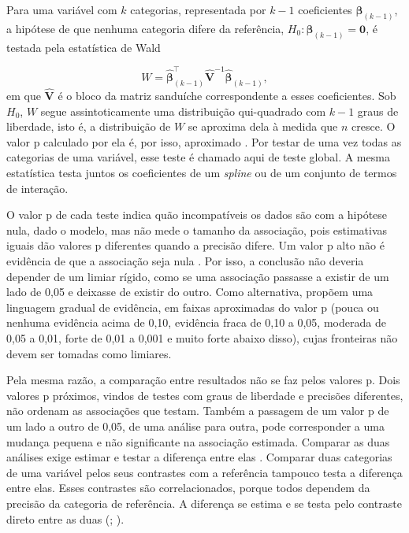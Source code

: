 \documentclass[12pt,a4paper]{article}
\begin{document}
Para uma variável com $k$ categorias, representada por $k-1$ coeficientes $\boldsymbol{\beta}_{(k-1)}$, a hipótese de que nenhuma categoria difere da referência, $H_0: \boldsymbol{\beta}_{(k-1)} = \mathbf{0}$, é testada pela estatística de Wald

\begin{equation}
  W = \hat{\boldsymbol{\beta}}_{(k-1)}^\top \widehat{\mathbf{V}}^{-1} \hat{\boldsymbol{\beta}}_{(k-1)},
\end{equation}
em que $\widehat{\mathbf{V}}$ é o bloco da matriz sanduíche correspondente a esses coeficientes. Sob $H_0$, $W$ segue assintoticamente uma distribuição qui-quadrado com $k-1$ graus de liberdade, isto é, a distribuição de $W$ se aproxima dela à medida que $n$ cresce. O valor p calculado por ela é, por isso, aproximado \citep[pp.~129--131, 280]{agresti2015foundations}. Por testar de uma vez todas as categorias de uma variável, esse teste é chamado aqui de teste global. A mesma estatística testa juntos os coeficientes de um \textit{spline} ou de um conjunto de termos de interação.

O valor p de cada teste indica quão incompatíveis os dados são com a hipótese nula, dado o modelo, mas não mede o tamanho da associação, pois estimativas iguais dão valores p diferentes quando a precisão difere. Um valor p alto não é evidência de que a associação seja nula \citep[p.~341]{wasserstein2016asa,greenland2016statistical}. Por isso, a conclusão não deveria depender de um limiar rígido, como se uma associação passasse a existir de um lado de 0,05 e deixasse de existir do outro. Como alternativa, \citet{muff2022rewriting} propõem uma linguagem gradual de evidência, em faixas aproximadas do valor p (pouca ou nenhuma evidência acima de 0,10, evidência fraca de 0,10 a 0,05, moderada de 0,05 a 0,01, forte de 0,01 a 0,001 e muito forte abaixo disso), cujas fronteiras não devem ser tomadas como limiares.

Pela mesma razão, a comparação entre resultados não se faz pelos valores p. Dois valores p próximos, vindos de testes com graus de liberdade e precisões diferentes, não ordenam as associações que testam. Também a passagem de um valor p de um lado a outro de 0,05, de uma análise para outra, pode corresponder a uma mudança pequena e não significante na associação estimada. Comparar as duas análises exige estimar e testar a diferença entre elas \citep{gelman2006difference}. Comparar duas categorias de uma variável pelos seus contrastes com a referência tampouco testa a diferença entre elas. Esses contrastes são correlacionados, porque todos dependem da precisão da categoria de referência. A diferença se estima e se testa pelo contraste direto entre as duas (\citealp[p.~1025]{easton1991floating}; \citealp[pp.~329--330]{gelman2006difference}).
\end{document}
